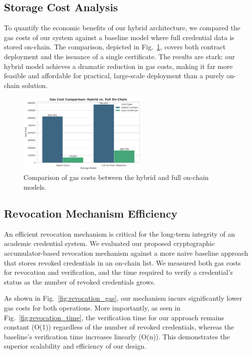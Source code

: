 \documentclass[lettersize,journal]{IEEEtran}
\begin{document}
\begin{itemize}
\subsection{Storage Cost Analysis}
To quantify the economic benefits of our hybrid architecture, we compared the gas costs of our system against a baseline model where full credential data is stored on-chain. The comparison, depicted in Fig.~\ref{fig:storage_cost}, covers both contract deployment and the issuance of a single certificate. The results are stark: our hybrid model achieves a dramatic reduction in gas costs, making it far more feasible and affordable for practical, large-scale deployment than a purely on-chain solution.

\begin{figure}[!t]
\centering
\includegraphics[width=2.5in]{figures/fig4_storage_cost.png}
\caption{Comparison of gas costs between the hybrid and full on-chain models.}
\label{fig:storage_cost}
\end{figure}

\subsection{Revocation Mechanism Efficiency}
An efficient revocation mechanism is critical for the long-term integrity of an academic credential system. We evaluated our proposed cryptographic accumulator-based revocation mechanism against a more naive baseline approach that stores revoked credentials in an on-chain list. We measured both gas costs for revocation and verification, and the time required to verify a credential's status as the number of revoked credentials grows.

As shown in Fig.~\ref{fig:revocation_gas}, our mechanism incurs significantly lower gas costs for both operations. More importantly, as seen in Fig.~\ref{fig:revocation_time}, the verification time for our approach remains constant (O(1)) regardless of the number of revoked credentials, whereas the baseline's verification time increases linearly (O(n)). This demonstrates the superior scalability and efficiency of our design.


\end{itemize}
\end{document}
